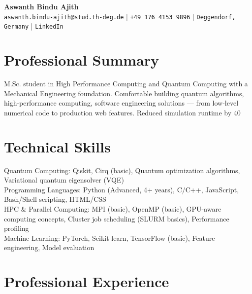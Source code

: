 \documentclass[11pt,a4paper]{article}
\begin{document}
\begin{center}
    {\LARGE\bfseries Aswanth Bindu Ajith}\\[4pt]
    \texttt{aswanth.bindu-ajith@stud.th-deg.de} | \texttt{+49 176 4153 9896} | \texttt{Deggendorf, Germany} | \texttt{LinkedIn}
\end{center}

\section{Professional Summary}
M.Sc. student in High Performance Computing and Quantum Computing with a Mechanical Engineering foundation. Comfortable building quantum algorithms, high-performance computing, software engineering solutions — from low-level numerical code to production web features. Reduced simulation runtime by 40%

\section{Technical Skills}

Quantum Computing: Qiskit, Cirq (basic), Quantum optimization algorithms, Variational quantum eigensolver (VQE)\\

Programming Languages: Python (Advanced, 4+ years), C/C++, JavaScript, Bash/Shell scripting, HTML/CSS\\

HPC & Parallel Computing: MPI (basic), OpenMP (basic), GPU-aware computing concepts, Cluster job scheduling (SLURM basics), Performance profiling\\

Machine Learning: PyTorch, Scikit-learn, TensorFlow (basic), Feature engineering, Model evaluation


\section{Professional Experience}
\end{document}
